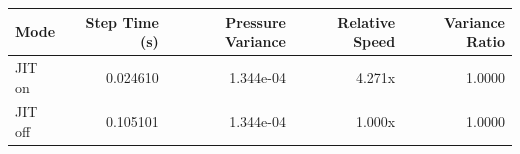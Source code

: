 \begin{tabular}{lrrrr}
\toprule
Mode & Step Time (s) & Pressure Variance & Relative Speed & Variance Ratio \\
\midrule
JIT on & 0.024610 & 1.344e-04 & 4.271x & 1.0000 \\
JIT off & 0.105101 & 1.344e-04 & 1.000x & 1.0000 \\
\bottomrule
\end{tabular}
